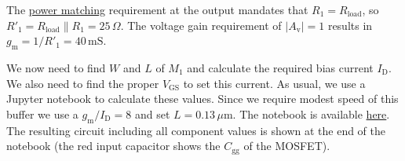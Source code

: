\documentclass[
  a4paper,
  DIV=11,
  numbers=noendperiod]{scrartcl}
\begin{document}
The \href{https://en.wikipedia.org/wiki/Impedance_matching}{power
matching} requirement at the output mandates that
\(R_1 = R_\mathrm{load}\), so
\(R'_1 = R_\mathrm{load} \parallel R_1 = 25\,\Omega\). The voltage gain
requirement of \(|A_\mathrm{v}| = 1\) results in
\(g_\mathrm{m}= 1 / R'_1 = 40\,\text{mS}\).

We now need to find \(W\) and \(L\) of \(M_1\) and calculate the
required bias current \(I_\mathrm{D}\). We also need to find the proper
\(V_\mathrm{GS}\) to set this current. As usual, we use a Jupyter
notebook to calculate these values. Since we require modest speed of
this buffer we use a \(g_\mathrm{m}/I_\mathrm{D}=8\) and set
\(L = 0.13\,\mu\text{m}\). The notebook is available
\href{./sizing/sizing_measurement_amplifier.ipynb}{here}. The resulting
circuit including all component values is shown at the end of the
notebook (the red input capacitor shows the \(C_\mathrm{gg}\) of the
MOSFET).
\end{document}
